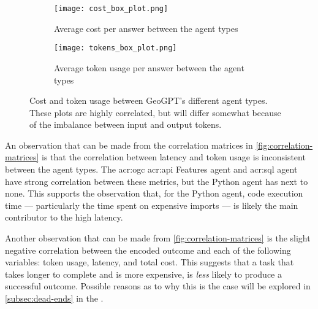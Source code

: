 \begin{figure}[htbp]
    \centering
    \begin{subfigure}[b]{0.48\textwidth}
        \centering
        \texttt{[image: cost\_box\_plot.png]}
        \caption{Average cost per answer between the agent types}
        \label{fig:cost-box-plot}
    \end{subfigure}
    \hfill
    \begin{subfigure}[b]{0.48\textwidth}
        \centering
        \texttt{[image: tokens\_box\_plot.png]}
        \caption{Average token usage per answer between the agent types}
        \label{fig:tokens-box-plot}
    \end{subfigure}
    \caption[Cost and token usage between GeoGPT's different agent types]{Cost and token usage between GeoGPT's different agent types. These plots are highly correlated, but will differ somewhat because of the imbalance between input and output tokens.}
    \label{fig:cost-and-tokens}
\end{figure}

An observation that can be made from the correlation matrices in \autoref{fig:correlation-matrices} is that the correlation between latency and token usage is inconsistent between the agent types. The \acrshort{acr:ogc} \acrshort{acr:api} Features agent and \acrshort{acr:sql} agent have strong correlation between these metrics, but the Python agent has next to none. This supports the observation that, for the Python agent, code execution time --- particularly the time spent on expensive imports --- is likely the main contributor to the high latency.

Another observation that can be made from \autoref{fig:correlation-matrices} is the slight negative correlation between the encoded outcome and each of the following variables: token usage, latency, and total cost. This suggests that a task that takes longer to complete and is more expensive, is \textit{less} likely to produce a successful outcome. Possible reasons as to why this is the case will be explored in \autoref{subsec:dead-ends} in the .

